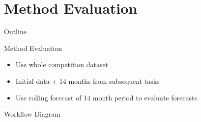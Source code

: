 \documentclass{beamer}
\begin{document}
\section{Method Evaluation}
\begin{frame}[noframenumbering]{Outline}
\tableofcontents[currentsection]
\end{frame}
\begin{frame}{Method Evaluation}
\begin{itemize}
\item Use whole competition dataset 
\pause
\item Initial data + 14 months from subsequent tasks
\pause
\item Use rolling forecast of 14 month period to evaluate forecasts
\end{itemize}
\pause
\begin{figure}
\centering
{}
\end{figure}

\end{frame}





\begin{frame}{Workflow Diagram}
\begin{figure}
\centering
\hspace*{-1.5em}
\end{figure}
\end{frame}

\end{document}
